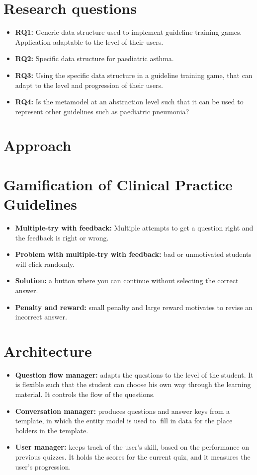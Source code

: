 \documentclass[20pt]{extarticle}
\begin{document}
	\section{Research questions}
	\begin{itemize}
		\item \textbf{RQ1:} Generic data structure used to implement guideline training games. Application adaptable to the level of their users.
		\item \textbf{RQ2:} Specific data structure for paediatric asthma. 
		\item \textbf{RQ3:} Using the specific data structure in a guideline training game, that can adapt to the level and progression of their users.
		\item \textbf{RQ4:} Is the metamodel at an abstraction level such that it can be used to represent other guidelines such as paediatric pneumonia?
	\end{itemize}
	
	\section{Approach}
	
	\section{Gamification of Clinical Practice Guidelines}
	\begin{itemize}
		\item \textbf{Multiple-try with feedback:} Multiple attempts to get a question right and the feedback is right or wrong.
		\item \textbf{Problem with multiple-try with feedback:} bad or unmotivated students will click randomly.
		\item \textbf{Solution:} a button where you can continue without selecting the correct answer.
		\item \textbf{Penalty and reward:} small penalty and large reward motivates to revise an incorrect answer.
	\end{itemize}
	
	\section{Architecture}
	\begin{itemize}
		\item \textbf{Question flow manager:} adapts the questions to the level of the student. It is flexible such that the student can choose his own way through the learning material. It controls the flow of the questions.
		\item \textbf{Conversation manager:} produces questions and answer keys from a template, in which the entity model is used to fill in data for the place holders in the template.
		\item \textbf{User manager:} keeps track of the user's skill, based on the performance on previous quizzes. It holds the scores for the current quiz, and it measures the user's progression.
	\end{itemize}
	
\end{document}
